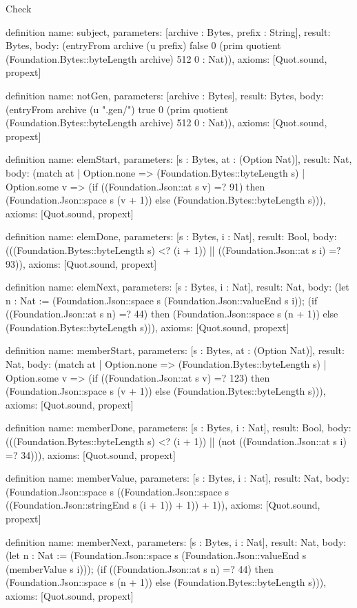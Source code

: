 \begin{lexlean}{Check}
\begin{semanticmodule}
definition{
  name: subject,
  parameters: [archive : Bytes, prefix : String],
  result: Bytes,
  body: (entryFrom archive (u prefix) false 0 (prim quotient (Foundation.Bytes::byteLength archive) 512 0 : Nat)),
  axioms: [Quot.sound, propext]
}

definition{
  name: notGen,
  parameters: [archive : Bytes],
  result: Bytes,
  body: (entryFrom archive (u ".gen/") true 0 (prim quotient (Foundation.Bytes::byteLength archive) 512 0 : Nat)),
  axioms: [Quot.sound, propext]
}

definition{
  name: elemStart,
  parameters: [s : Bytes, at : (Option Nat)],
  result: Nat,
  body: (match at
    | Option.none => (Foundation.Bytes::byteLength s)
    | Option.some v => (if ((Foundation.Json::at s v) =? 91) then (Foundation.Json::space s (v + 1)) else (Foundation.Bytes::byteLength s))),
  axioms: [Quot.sound, propext]
}

definition{
  name: elemDone,
  parameters: [s : Bytes, i : Nat],
  result: Bool,
  body: (((Foundation.Bytes::byteLength s) <? (i + 1)) || ((Foundation.Json::at s i) =? 93)),
  axioms: [Quot.sound, propext]
}

definition{
  name: elemNext,
  parameters: [s : Bytes, i : Nat],
  result: Nat,
  body: (let n : Nat := (Foundation.Json::space s (Foundation.Json::valueEnd s i)); (if ((Foundation.Json::at s n) =? 44) then (Foundation.Json::space s (n + 1)) else (Foundation.Bytes::byteLength s))),
  axioms: [Quot.sound, propext]
}

definition{
  name: memberStart,
  parameters: [s : Bytes, at : (Option Nat)],
  result: Nat,
  body: (match at
    | Option.none => (Foundation.Bytes::byteLength s)
    | Option.some v => (if ((Foundation.Json::at s v) =? 123) then (Foundation.Json::space s (v + 1)) else (Foundation.Bytes::byteLength s))),
  axioms: [Quot.sound, propext]
}

definition{
  name: memberDone,
  parameters: [s : Bytes, i : Nat],
  result: Bool,
  body: (((Foundation.Bytes::byteLength s) <? (i + 1)) || (not ((Foundation.Json::at s i) =? 34))),
  axioms: [Quot.sound, propext]
}

definition{
  name: memberValue,
  parameters: [s : Bytes, i : Nat],
  result: Nat,
  body: (Foundation.Json::space s ((Foundation.Json::space s ((Foundation.Json::stringEnd s (i + 1)) + 1)) + 1)),
  axioms: [Quot.sound, propext]
}

definition{
  name: memberNext,
  parameters: [s : Bytes, i : Nat],
  result: Nat,
  body: (let n : Nat := (Foundation.Json::space s (Foundation.Json::valueEnd s (memberValue s i))); (if ((Foundation.Json::at s n) =? 44) then (Foundation.Json::space s (n + 1)) else (Foundation.Bytes::byteLength s))),
  axioms: [Quot.sound, propext]
}


\end{semanticmodule}
\end{lexlean}
